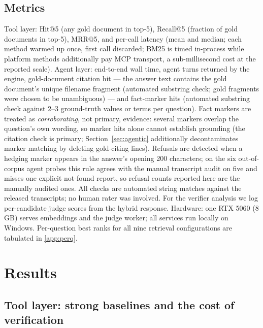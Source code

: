 \documentclass[preprint,12pt]{elsarticle}
\begin{document}
\subsection{Metrics}
Tool layer: Hit@5 (any gold document in top-5), Recall@5 (fraction of gold
documents in top-5), MRR@5, and per-call latency (mean and median; each
method warmed up once, first call discarded; BM25 is timed in-process
while platform methods additionally pay MCP transport, a sub-millisecond
cost at the reported scale). Agent layer: end-to-end wall
time, agent turns returned by the engine, gold-document citation hit ---
the answer text contains the gold document's unique filename fragment
(automated substring check; gold fragments were chosen to be unambiguous) ---
and fact-marker hits (automated substring check against 2--3
ground-truth values or terms per question). Fact markers are treated as
\emph{corroborating}, not primary, evidence: several markers overlap the
question's own wording, so marker hits alone cannot establish grounding
(the citation check is primary; Section~\ref{sec:agentic} additionally
decontaminates marker matching by deleting gold-citing lines). Refusals
are detected when a hedging marker appears in the answer's opening 200
characters; on the six out-of-corpus agent probes this rule agrees with
the manual transcript audit on five and misses one explicit not-found
report, so refusal counts reported here are the manually audited ones. All checks
are automated string matches against the released transcripts; no human
rater was involved. For the verifier analysis we log per-candidate judge
scores from the hybrid response. Hardware: one RTX 5060 (8\,GB) serves
embeddings and the judge worker; all services run locally on Windows.
Per-question best ranks for all nine retrieval configurations are
tabulated in \ref{app:perq}.

\section{Results}
\label{sec:results}

\subsection{Tool layer: strong baselines and the cost of verification}
\label{sec:retrieval}
\end{document}
